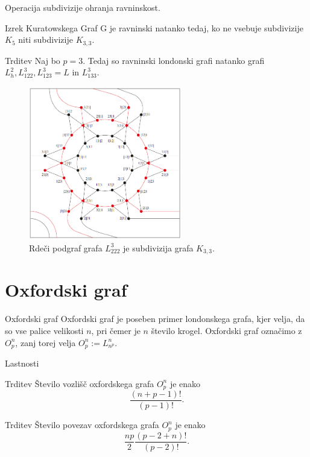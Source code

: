 \documentclass[dvipsnames]{beamer}
\begin{document}
\begin{frame}
    Operacija \alert{subdivizije} ohranja ravninskost.
    \begin{block}{Izrek Kuratowskega}
           	Graf G je ravninski natanko tedaj, ko ne vsebuje subdivizije $K_5$ niti subdivizije $K_{3,3}$.
    \end{block}

    \begin{block}{Trditev}
           	Naj bo $p=3$. Tedaj so ravninski londonski grafi natanko grafi $L_h^2, L_{122}^3,L_{123}^3 = L$ in $ L_{133}^3$.
    \end{block}

\end{frame}

\begin{frame}
    \begin{figure}[h]
        \includegraphics[width=190pt]{../img/tolgraph-O^3_222-subdivision.png}
        \caption{Rdeči podgraf grafa $L_{222}^3$ je subdivizija grafa $K_{3,3}$.}
    \end{figure}
\end{frame}

\section{Oxfordski graf}
\begin{frame}{Oxfordski graf}
    \alert{Oxfordski graf} je poseben primer londonskega grafa, kjer velja, da so vse palice velikosti $n$, pri čemer je $n$ število krogel. Oxfordski graf označimo z $O^n_p$, zanj torej velja $O^n_p := L^n_{n^p}$.
    
\end{frame}

\begin{frame}{Lastnosti}
    \begin{block}{Trditev}
           Število vozlišč oxfordskega grafa $O^n_p$ je enako \[\frac{(n+p-1)!}{(p-1)!}.\]
    \end{block}    
    \begin{block}{Trditev}
        Število povezav oxfordskega grafa $O^n_p$ je enako
        \[ \frac{np}{2} \frac{(p-2+n)!}{(p-2)!} .\]
    \end{block}
    

\end{frame}
\end{document}
